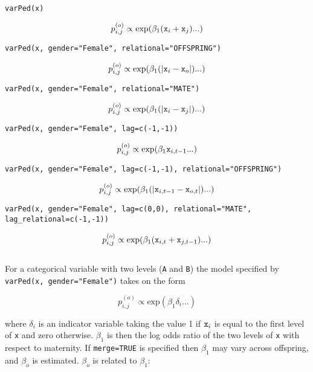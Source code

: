 \documentclass{article}
\begin{document}
\texttt{varPed(x)}

\begin{equation}
p^{(o)}_{i,j} \propto \textrm{exp}(\beta_{1}(\textrm{\texttt{x}}_{i}+\textrm{\texttt{x}}_{j})...)
\end{equation}

\texttt{varPed(x, gender="Female", relational="OFFSPRING")}

\begin{equation}
p^{(o)}_{i,j} \propto \textrm{exp}(\beta_{1}(|\textrm{\texttt{x}}_{i}-\textrm{\texttt{x}}_{o}|)...)
\end{equation}

\texttt{varPed(x, gender="Female", relational="MATE")}

\begin{equation}
p^{(o)}_{i,j} \propto \textrm{exp}(\beta_{1}(|\textrm{\texttt{x}}_{i}-\textrm{\texttt{x}}_{j}|)...)
\end{equation}

\texttt{varPed(x, gender="Female", lag=c(-1,-1))}

\begin{equation}
p^{(o)}_{i,j} \propto \textrm{exp}(\beta_{1}\textrm{\texttt{x}}_{i,t-1}...)
\end{equation}

\texttt{varPed(x, gender="Female", lag=c(-1,-1), relational="OFFSPRING")}

\begin{equation}
p^{(o)}_{i,j} \propto \textrm{exp}(\beta_{1}(|\textrm{\texttt{x}}_{i,t-1}-\textrm{\texttt{x}}_{o,t}|)...)
\end{equation}

\texttt{varPed(x, gender="Female", lag=c(0,0), relational="MATE",}\\
\texttt{lag\_relational=c(-1,-1))}

\begin{equation}
p^{(o)}_{i,j} \propto \textrm{exp}(\beta_{1}(\textrm{\texttt{x}}_{i,t}+\textrm{\texttt{x}}_{j,t-1})...)
\end{equation}\\

For a categorical variable with two levels (\texttt{A} and \texttt{B}) the model specified by \texttt{varPed(x, gender="Female")} takes on the form

\begin{equation}
p^{(o)}_{i,j} \propto \textrm{exp}(\beta_{1}\delta_{i}...)
\end{equation}

where $\delta_{i}$ is an indicator variable taking the value 1 if $\textrm{\texttt{x}}_{i}$ is equal to the first level of \texttt{x} and zero otherwise. $\beta_{1}$ is then the log odds ratio of the two levels of \texttt{x} with respect to maternity.  If \texttt{merge=TRUE} is specified then $\beta_{1}$ may vary across offspring, and $\beta_{o}$ is estimated. $\beta_{o}$ is related to $\beta_{1}$:
\end{document}
